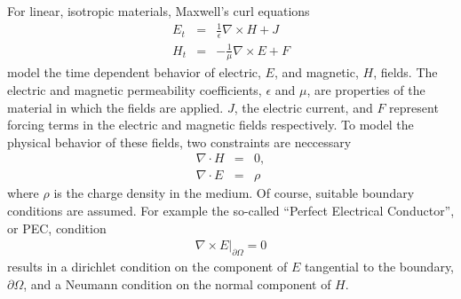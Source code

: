 \documentclass[12pt]{article}
\begin{document}
For linear, isotropic materials, Maxwell's curl equations
\begin{eqnarray}
E_t &=&\frac{1}{\epsilon}\nabla \times H + J \label{eq:mxe}\\
H_t &=& -\frac{1}{\mu}\nabla \times E + F\label{eq:mxh}
\end{eqnarray}
model the time dependent behavior of electric, $E$, and magnetic, $H$,
fields.  The electric and magnetic permeability coefficients,
$\epsilon$ and $\mu$, are properties of the material in which the
fields are applied.  $J$, the electric current, and $F$ represent
forcing terms in the electric and magnetic fields respectively.
To model the physical behavior of these fields, two constraints are
neccessary
\begin{eqnarray}
\nabla\cdot H &=& 0,\\
\nabla\cdot E &=& \rho
\end{eqnarray}
where $\rho$ is the charge density in the medium.  Of course, suitable
boundary conditions are assumed.  For example the so-called
``Perfect Electrical Conductor'', or PEC, condition
\begin{eqnarray*}
\left.\nabla\times E\right|_{\partial \Omega} = 0
\end{eqnarray*}
results in a dirichlet condition on the component of $E$ tangential to
the boundary, $\partial\Omega$, and a Neumann condition on the normal
component of $H$.
\end{document}
